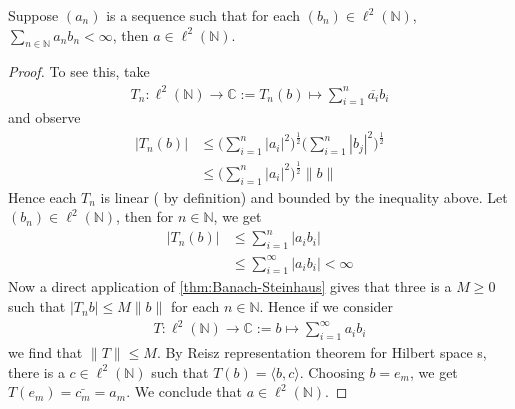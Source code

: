 \begin{exercise}
  Suppose $(a_n)$ is a sequence such that for
  each $(b_n) \in \ell^{2}(\mathbb{N})$,
  $\sum_{n \in \mathbb{N}} a_n b_n < \infty$, then $a \in \ell^{2}(\mathbb{N})$.
\end{exercise}
\begin{proof}
  To see this, take
  \begin{align*}
    T_n : \ell^{2}(\mathbb{N}) \to \mathbb{C} := T_n(b) \mapsto \sum_{i =
    1}^{n} \overline{a_i}b_i
  \end{align*}
  and observe
  \begin{align*}
    |T_n(b)| &\le \Big( \sum_{i = 1}^{n} |a_i|^2\Big)^{\frac{1}{2}}
    \Big( \sum_{i = 1}^{n} |b_j|^2\Big)^{\frac{1}{2}} \\
    & \le  \Big( \sum_{i = 1}^{n} |a_i|^2\Big)^{\frac{1}{2}} \|b\|
  \end{align*}
  Hence each $T_n$ is linear ( by definition) and bounded by the
  inequality above.
  Let $(b_n) \in \ell^{2}(\mathbb{N})$, then for $ n \in \mathbb{N}$, we get
  \begin{align*}
    |T_n(b)| & \le \sum_{i = 1}^{n} |a_ib_i| \\
    &\le \sum_{i = 1}^{\infty} |a_ib_i| < \infty
  \end{align*}
  Now a direct application of
  \autoref{thm:Banach-Steinhaus} gives that three is a $M \ge 0$ such
  that $|T_n b| \le M \|b\|$ for each $n \in \mathbb{N}$. Hence if we consider
  \begin{align*}
    T : \ell^{2}(\mathbb{N}) \to \mathbb{C} := b \mapsto \sum_{i =
    1}^{\infty}  a_ib_i
  \end{align*}
  we find that $\|T\| \le M$. By Reisz representation theorem for
  Hilbert space s, there is a $c \in \ell^{2}(\mathbb{N})$ such that
  $T(b) = \langle b , c \rangle$. Choosing $b = e_m$, we get $T(e_m)
  = \bar{c_m} = a_m$. We conclude that $a \in \ell^{2}(\mathbb{N})$.
\end{proof}

